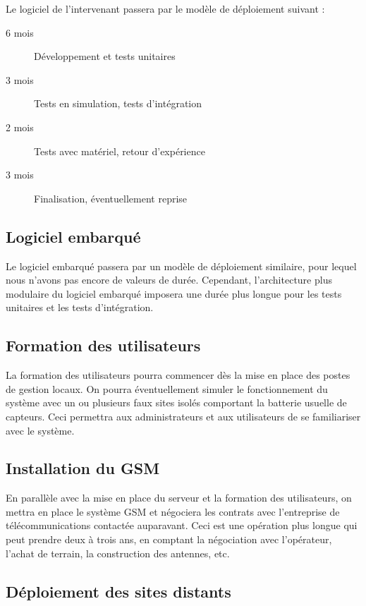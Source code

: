\documentclass[a4paper, 11pt, draft]{article}
\begin{document}
Le logiciel de l'intervenant passera par le modèle de déploiement suivant :
\begin{description}
\item[6 mois] Développement et tests unitaires
\item[3 mois] Tests en simulation, tests d'intégration
\item[2 mois] Tests avec matériel, retour d'expérience
\item[3 mois] Finalisation, éventuellement reprise
\end{description}

\subsection{Logiciel embarqué}

Le logiciel embarqué passera par un modèle de déploiement similaire, pour lequel nous n'avons pas encore de valeurs de durée. Cependant, l'architecture plus modulaire du logiciel embarqué imposera une durée plus longue pour les tests unitaires et les tests d'intégration.

\subsection{Formation des utilisateurs}

La formation des utilisateurs pourra commencer dès la mise en place des postes de gestion locaux. On pourra éventuellement simuler le fonctionnement du système avec un ou plusieurs faux sites isolés comportant la batterie usuelle de capteurs. Ceci permettra aux administrateurs et aux utilisateurs de se familiariser avec le système.

\subsection{Installation du GSM}

En parallèle avec la mise en place du serveur et la formation des utilisateurs, on mettra en place le système GSM et négociera les contrats avec l'entreprise de télécommunications contactée auparavant. Ceci est une opération plus longue qui peut prendre deux à trois ans, en comptant la négociation avec l'opérateur, l'achat de terrain, la construction des antennes, etc.

\subsection{Déploiement des sites distants}
\end{document}
